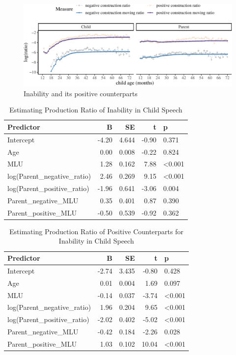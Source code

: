 \documentclass[
  english,
  man,floatsintext]{apa6}
\begin{document}
\begin{figure}[H]

{\centering \includegraphics{neg_construction_article_files/figure-latex/inability-1} 

}

\caption{Inability and its positive counterparts}\label{fig:inability}
\end{figure}

\begin{table}

\caption{\label{tab:unnamed-chunk-5}Estimating Production Ratio of Inability in Child Speech}
\centering
\begin{tabular}[t]{l|r|r|r|l}
\hline
Predictor & B & SE & t & p\\
\hline
Intercept & -4.20 & 4.644 & -0.90 & 0.371\\
\hline
Age & 0.00 & 0.008 & -0.22 & 0.824\\
\hline
MLU & 1.28 & 0.162 & 7.88 & <0.001\\
\hline
log(Parent\_negative\_ratio) & 2.46 & 0.269 & 9.15 & <0.001\\
\hline
log(Parent\_positive\_ratio) & -1.96 & 0.641 & -3.06 & 0.004\\
\hline
Parent\_negative\_MLU & 0.35 & 0.401 & 0.87 & 0.390\\
\hline
Parent\_positive\_MLU & -0.50 & 0.539 & -0.92 & 0.362\\
\hline
\end{tabular}
\end{table}

\begin{table}

\caption{\label{tab:unnamed-chunk-5}Estimating Production Ratio of Positive Counterparts for Inability in Child Speech}
\centering
\begin{tabular}[t]{l|r|r|r|l}
\hline
Predictor & B & SE & t & p\\
\hline
Intercept & -2.74 & 3.435 & -0.80 & 0.428\\
\hline
Age & 0.01 & 0.004 & 1.69 & 0.097\\
\hline
MLU & -0.14 & 0.037 & -3.74 & <0.001\\
\hline
log(Parent\_negative\_ratio) & 1.96 & 0.204 & 9.65 & <0.001\\
\hline
log(Parent\_positive\_ratio) & -2.02 & 0.402 & -5.02 & <0.001\\
\hline
Parent\_negative\_MLU & -0.42 & 0.184 & -2.26 & 0.028\\
\hline
Parent\_positive\_MLU & 1.03 & 0.102 & 10.04 & <0.001\\
\hline
\end{tabular}
\end{table}
\end{document}
